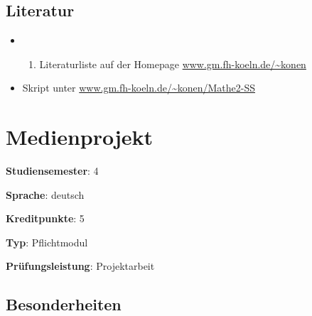 \hypertarget{literaturpathlabel....srcmodulbeschreibungen-bachelor-bpo5ba_mathematik2}{%
\section*{Literatur\label{../../src/modulbeschreibungen-bachelor-bpo5/BA_Mathematik2}}\label{literaturpathlabel....srcmodulbeschreibungen-bachelor-bpo5ba_mathematik2}}

\begin{itemize}
\tightlist
\item
  \begin{enumerate}
  \def\labelenumi{\alph{enumi}.}
  \setcounter{enumi}{18}
  \tightlist
  \item
    Literaturliste auf der Homepage
    \href{http://www.gm.fh-koeln.de/~konen}{www.gm.fh-koeln.de/\textasciitilde konen}
  \end{enumerate}
\item
  Skript unter
  \href{http://www.gm.fh-koeln.de/~konen/Mathe2-SS}{www.gm.fh-koeln.de/\textasciitilde konen/Mathe2-SS}
\end{itemize}

\hypertarget{medienprojektpathlabel....srcmodulbeschreibungen-bachelor-bpo5ba_medienprojekt}{%
\chapter{Medienprojekt\label{../../src/modulbeschreibungen-bachelor-bpo5/BA_Medienprojekt}}\label{medienprojektpathlabel....srcmodulbeschreibungen-bachelor-bpo5ba_medienprojekt}}

\begin{modulHead}
\textbf{Studiensemester}:
4
\end{modulHead}
\begin{modulHead}
\textbf{Sprache}:
deutsch
\end{modulHead}
\begin{modulHead}
\textbf{Kreditpunkte}:
5
\end{modulHead}
\begin{modulHead}
\textbf{Typ}:
Pflichtmodul
\end{modulHead}
\begin{modulHead}
\textbf{Prüfungsleistung}:
Projektarbeit
\end{modulHead}


\hypertarget{besonderheitenpathlabel....srcmodulbeschreibungen-bachelor-bpo5ba_medienprojekt}{%
\section*{Besonderheiten\label{../../src/modulbeschreibungen-bachelor-bpo5/BA_Medienprojekt}}\label{besonderheitenpathlabel....srcmodulbeschreibungen-bachelor-bpo5ba_medienprojekt}}

